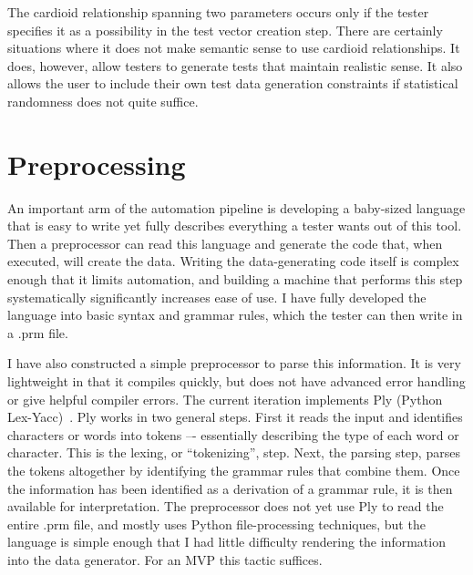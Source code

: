 The cardioid relationship spanning two parameters occurs only if the tester specifies it as a possibility in the test vector creation step. There are certainly situations where it does not make semantic sense to use cardioid relationships. It does, however, allow testers to generate tests that maintain realistic sense. It also allows the user to include their own test data generation constraints if statistical randomness does not quite suffice.

\section{Preprocessing}

An important arm of the automation pipeline is developing a baby-sized language that is easy to write yet fully describes everything a tester wants out of this tool. Then a preprocessor can read this language and generate the code that, when executed, will create the data. Writing the data-generating code itself is complex enough that it limits automation, and building a machine that performs this step systematically significantly increases ease of use. I have fully developed the language into basic syntax and grammar rules, which the tester can then write in a .prm file.

I have also constructed a simple preprocessor to parse this information. It is very lightweight in that it compiles quickly, but does not have advanced error handling or give helpful compiler errors. The current iteration implements Ply (Python Lex-Yacc)~\cite{PythonLexYacc}. Ply works in two general steps. First it reads the input and identifies characters or words into tokens –- essentially describing the type of each word or character. This is the lexing, or ``tokenizing'', step. Next, the parsing step, parses the tokens altogether by identifying the grammar rules that combine them. Once the information has been identified as a derivation of a grammar rule, it is then available for interpretation. The preprocessor does not yet use Ply to read the entire .prm file, and mostly uses Python file-processing techniques, but the language is simple enough that I had little difficulty rendering the information into the data generator. For an MVP this tactic suffices.
